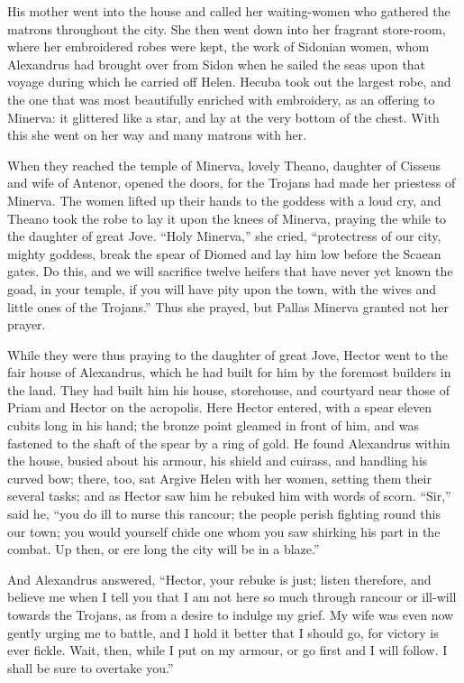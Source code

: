 His mother went into the house and called her waiting-women who gathered
the matrons throughout the city. She then went down into her fragrant
store-room, where her embroidered robes were kept, the work of Sidonian
women, whom Alexandrus had brought over from Sidon when he sailed the seas
upon that voyage during which he carried off Helen. Hecuba took out the
largest robe, and the one that was most beautifully enriched with
embroidery, as an offering to Minerva: it glittered like a star, and lay
at the very bottom of the chest. With this she went on her way and many
matrons with her.

When they reached the temple of Minerva, lovely Theano, daughter of
Cisseus and wife of Antenor, opened the doors, for the Trojans had made
her priestess of Minerva. The women lifted up their hands to the goddess
with a loud cry, and Theano took the robe to lay it upon the knees of
Minerva, praying the while to the daughter of great Jove. “Holy Minerva,”
she cried, “protectress of our city, mighty goddess, break the spear of
Diomed and lay him low before the Scaean gates. Do this, and we will
sacrifice twelve heifers that have never yet known the goad, in your
temple, if you will have pity upon the town, with the wives and little
ones of the Trojans.” Thus she prayed, but Pallas Minerva granted not her
prayer.

While they were thus praying to the daughter of great Jove, Hector went to
the fair house of Alexandrus, which he had built for him by the foremost
builders in the land. They had built him his house, storehouse, and
courtyard near those of Priam and Hector on the acropolis. Here Hector
entered, with a spear eleven cubits long in his hand; the bronze point
gleamed in front of him, and was fastened to the shaft of the spear by a
ring of gold. He found Alexandrus within the house, busied about his
armour, his shield and cuirass, and handling his curved bow; there, too,
sat Argive Helen with her women, setting them their several tasks; and as
Hector saw him he rebuked him with words of scorn. “Sir,” said he, “you do
ill to nurse this rancour; the people perish fighting round this our town;
you would yourself chide one whom you saw shirking his part in the combat.
Up then, or ere long the city will be in a blaze.”

And Alexandrus answered, “Hector, your rebuke is just; listen therefore,
and believe me when I tell you that I am not here so much through rancour
or ill-will towards the Trojans, as from a desire to indulge my grief. My
wife was even now gently urging me to battle, and I hold it better that I
should go, for victory is ever fickle. Wait, then, while I put on my
armour, or go first and I will follow. I shall be sure to overtake you.”

